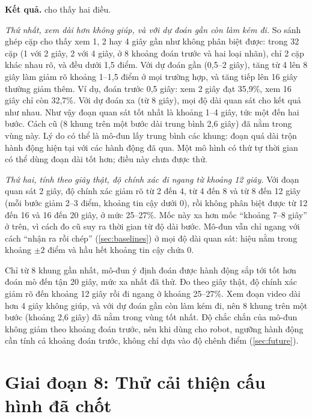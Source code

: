 \documentclass[a4paper,oneside]{report}
\begin{document}
\textbf{Kết quả.}  cho thấy hai điều.

\textit{Thứ nhất, xem dài hơn không giúp, và với dự đoán gần còn làm kém đi.} So sánh ghép cặp cho thấy xem 1, 2 hay 4 giây gần như không phân biệt được: trong 32 cặp (1 với 2 giây, 2 với 4 giây, ở 8 khoảng đoán trước và hai loại nhãn), chỉ 2 cặp khác nhau rõ, và đều dưới 1,5 điểm. Với dự đoán gần (0,5--2 giây), tăng từ 4 lên 8 giây làm giảm rõ khoảng 1--1,5 điểm ở mọi trường hợp, và tăng tiếp lên 16 giây thường giảm thêm. Ví dụ, đoán trước 0,5 giây: xem 2 giây đạt 35,9\%, xem 16 giây chỉ còn 32,7\%. Với dự đoán xa (từ 8 giây), mọi độ dài quan sát cho kết quả như nhau. Như vậy đoạn quan sát tốt nhất là khoảng 1--4 giây, tức một đến hai bước. Cách cũ (8 khung trên một bước dài trung bình 2,6 giây) đã nằm trong vùng này. Lý do có thể là mô-đun lấy trung bình các khung: đoạn quá dài trộn hành động hiện tại với các hành động đã qua. Một mô hình có thứ tự thời gian có thể dùng đoạn dài tốt hơn; điều này chưa được thử.

\textit{Thứ hai, tính theo giây thật, độ chính xác đi ngang từ khoảng 12 giây.} Với đoạn quan sát 2 giây, độ chính xác giảm rõ từ 2 đến 4, từ 4 đến 8 và từ 8 đến 12 giây (mỗi bước giảm 2--3 điểm, khoảng tin cậy dưới 0), rồi không phân biệt được từ 12 đến 16 và 16 đến 20 giây, ở mức 25--27\%. Mốc này xa hơn mốc ``khoảng 7--8 giây'' ở trên, vì cách đo cũ suy ra thời gian từ độ dài bước. Mô-đun vẫn chỉ ngang với cách ``nhận ra rồi chép'' (\cref{sec:baselines}) ở mọi độ dài quan sát: hiệu nằm trong khoảng $\pm2$ điểm và hầu hết khoảng tin cậy chứa 0.

\begin{ketqua}
Chỉ từ 8 khung gần nhất, mô-đun ý định đoán được hành động sắp tới tốt hơn đoán mò đến tận 20 giây, mức xa nhất đã thử. Đo theo giây thật, độ chính xác giảm rõ đến khoảng 12 giây rồi đi ngang ở khoảng 25--27\%. Xem đoạn video dài hơn 4 giây không giúp, và với dự đoán gần còn làm kém đi, nên 8 khung trên một bước (khoảng 2,6 giây) đã nằm trong vùng tốt nhất. Độ chắc chắn của mô-đun không giảm theo khoảng đoán trước, nên khi dùng cho robot, ngưỡng hành động cần tính cả khoảng đoán trước, không chỉ dựa vào độ chênh điểm (\cref{sec:future}).
\end{ketqua}

\section{Giai đoạn 8: Thử cải thiện cấu hình đã chốt}
\label{sec:stage8}
\end{document}
